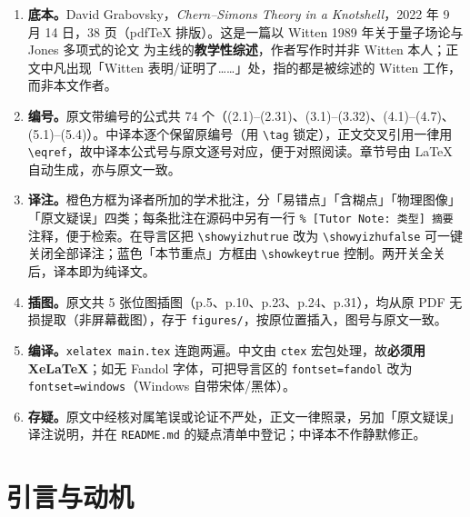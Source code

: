 \documentclass[11pt,a4paper]{article}
\newif\ifshowyizhu
\newcounter{yizhu}
\newif\ifshowkey
\begin{document}
\begin{enumerate}[leftmargin=1.6em,itemsep=4pt,topsep=4pt]
  \item \textbf{底本。}David Grabovsky，\emph{Chern--Simons Theory in a Knotshell}，2022 年 9 月 14 日，38 页（pdf\TeX{} 排版）。这是一篇以 Witten 1989 年关于量子场论与 Jones 多项式的论文 \cite{witten1989} 为主线的\textbf{教学性综述}，作者写作时并非 Witten 本人；正文中凡出现「Witten 表明/证明了……」处，指的都是被综述的 Witten 工作，而非本文作者。
  \item \textbf{编号。}原文带编号的公式共 74 个（(2.1)--(2.31)、(3.1)--(3.32)、(4.1)--(4.7)、(5.1)--(5.4)）。中译本逐个保留原编号（用 \verb|\tag| 锁定），正文交叉引用一律用 \verb|\eqref|，故中译本公式号与原文逐号对应，便于对照阅读。章节号由 \LaTeX{} 自动生成，亦与原文一致。
  \item \textbf{译注。}橙色方框为译者所加的学术批注，分「易错点」「含糊点」「物理图像」「原文疑误」四类；每条批注在源码中另有一行 \verb|% [Tutor Note: 类型] 摘要| 注释，便于检索。在导言区把 \verb|\showyizhutrue| 改为 \verb|\showyizhufalse| 可一键关闭全部译注；蓝色「本节重点」方框由 \verb|\showkeytrue| 控制。两开关全关后，译本即为纯译文。
  \item \textbf{插图。}原文共 5 张位图插图（p.5、p.10、p.23、p.24、p.31），均从原 PDF 无损提取（非屏幕截图），存于 \verb|figures/|，按原位置插入，图号与原文一致。
  \item \textbf{编译。}\verb|xelatex main.tex| 连跑两遍。中文由 \verb|ctex| 宏包处理，故\textbf{必须用 Xe\LaTeX}；如无 Fandol 字体，可把导言区的 \verb|fontset=fandol| 改为 \verb|fontset=windows|（Windows 自带宋体/黑体）。
  \item \textbf{存疑。}原文中经核对属笔误或论证不严处，正文一律照录，另加「原文疑误」译注说明，并在 \verb|README.md| 的疑点清单中登记；中译本不作静默修正。
\end{enumerate}

\newpage
\tableofcontents
\newpage

\section{引言与动机}\label{sec:1}
\end{document}
